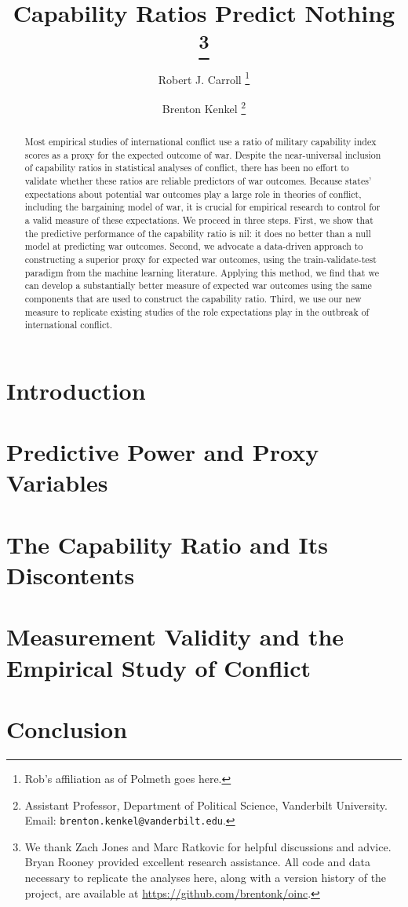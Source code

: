 \documentclass[11pt,oneside]{article}
\title{
  Capability Ratios Predict Nothing%
  \thanks{%
    We thank Zach Jones and Marc Ratkovic for helpful discussions and advice.
    Bryan Rooney provided excellent research assistance.
    All code and data necessary to replicate the analyses here, along with a version history of the project, are available at \url{https://github.com/brentonk/oinc}.
  }%
}
\author{%
  Robert J. Carroll%
  \thanks{%
    Rob's affiliation as of Polmeth goes here.
  }%
  \and%
  Brenton Kenkel%
  \thanks{
    Assistant Professor, Department of Political Science, Vanderbilt University.
    Email: \nolinkurl{brenton.kenkel@vanderbilt.edu}.
  }%
}
\begin{document}
\maketitle

\begin{abstract}
  Most empirical studies of international conflict use a ratio of military capability index scores as a proxy for the expected outcome of war.
  Despite the near-universal inclusion of capability ratios in statistical analyses of conflict, there has been no effort to validate whether these ratios are reliable predictors of war outcomes.
  Because states' expectations about potential war outcomes play a large role in theories of conflict, including the bargaining model of war, it is crucial for empirical research to control for a valid measure of these expectations.
  We proceed in three steps.
  First, we show that the predictive performance of the capability ratio is nil: it does no better than a null model at predicting war outcomes.
  Second, we advocate a data-driven approach to constructing a superior proxy for expected war outcomes, using the train-validate-test paradigm from the machine learning literature.
  Applying this method, we find that we can develop a substantially better measure of expected war outcomes using the same components that are used to construct the capability ratio.
  Third, we use our new measure to replicate existing studies of the role expectations play in the outbreak of international conflict.
\end{abstract}

\clearpage


\section{Introduction}


\section{Predictive Power and Proxy Variables}


\section{The Capability Ratio and Its Discontents}





\section{Measurement Validity and the Empirical Study of Conflict}


\section{Conclusion}
\end{document}
